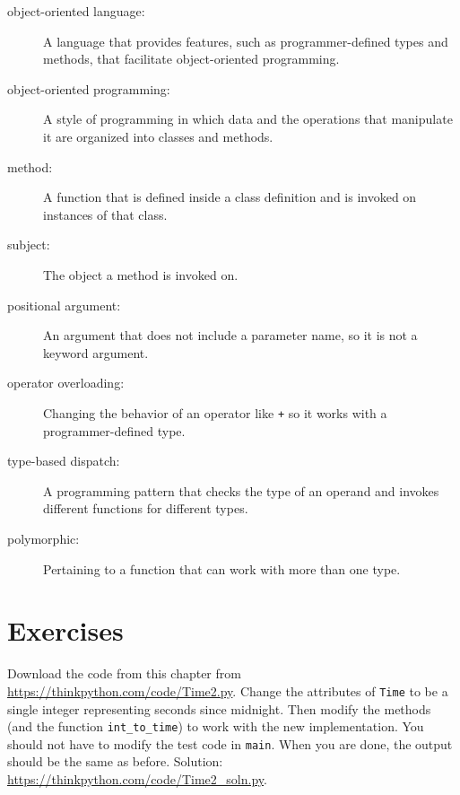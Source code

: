 \documentclass[10pt]{book}
\begin{document}
\begin{description}

\item[object-oriented language:] A language that provides features,
  such as programmer-defined types and methods, that facilitate
  object-oriented programming.

\item[object-oriented programming:] A style of programming in which
data and the operations that manipulate it are organized into classes
and methods.

\item[method:] A function that is defined inside a class definition and
is invoked on instances of that class.

\item[subject:] The object a method is invoked on.

\item[positional argument:]  An argument that does not include
a parameter name, so it is not a keyword argument.

\item[operator overloading:] Changing the behavior of an operator like
{\tt +} so it works with a programmer-defined type.

\item[type-based dispatch:] A programming pattern that checks the type
of an operand and invokes different functions for different types.

\item[polymorphic:] Pertaining to a function that can work with more
  than one type.

\end{description}


\section{Exercises}

\begin{exercise}

Download the code from this chapter from
\url{https://thinkpython.com/code/Time2.py}.  Change the attributes of
    {\tt Time} to be a single integer representing seconds since
    midnight.  Then modify the methods (and the function
    \verb"int_to_time") to work with the new implementation.  You
    should not have to modify the test code in {\tt main}.  When you
    are done, the output should be the same as before.  Solution:
    \url{https://thinkpython.com/code/Time2_soln.py}.

\end{exercise}
\end{document}
